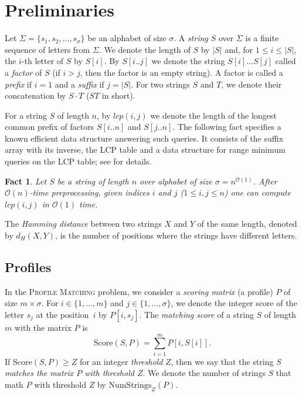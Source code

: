 \documentclass{article}
\theoremstyle{plain}
\newtheorem{fact}[theorem]{Fact}
\theoremstyle{definition}
\newcommand{\PM}{\textsc{Profile Matching}\xspace}
\newcommand{\Oh}{\mathcal{O}}
\newcommand{\lcp}{\mathit{lcp}}
\newcommand{\HammingDistance}{d_H}
\newcommand{\Score}{\mathrm{Score}}
\newcommand{\NumStrings}{\mathrm{NumStrings}}
\begin{document}
  \section{Preliminaries}\label{sec:Preliminaries}
    Let $\Sigma=\{s_1,s_2,\ldots,s_{\sigma}\}$ be an alphabet of size $\sigma$.
    A \emph{string} $S$ over $\Sigma$ is a finite sequence of letters from $\Sigma$.
    We denote the length of $S$ by $|S|$ and, for $1 \le i \le |S|$,
    the $i$-th letter of $S$ by $S[i]$.
    By $S[i..j]$ we denote the string $S[i] \ldots S[j]$ called a \emph{factor} of $S$
    (if $i>j$, then the factor is an empty string).
    A factor is called a \emph{prefix} if $i=1$ and a \emph{suffix} if $j=|S|$.
    For two strings $S$ and $T$, we denote their concatenation by $S \cdot T$ ($ST$ in short).

    For a string $S$ of length $n$, by $\lcp(i,j)$ we denote the length of the longest common prefix of factors $S[i..n]$ and $S[j..n]$.
    The following fact specifies a known efficient data structure answering such queries.
    It consists of the suffix array with its inverse, the LCP table and a data structure for range minimum queries on
    the LCP table; see \cite{AlgorithmsOnStrings} for details.

    \begin{fact}\label{fct:ver}
      Let $S$ be a string of length $n$ over alphabet of size $\sigma = n^{\Oh(1)}$.
      After $\Oh(n)$-time preprocessing, given indices $i$ and $j$ ($1 \le i,j \le n$) one can compute $\lcp(i,j)$ in $\Oh(1)$ time.
    \end{fact}

    The \emph{Hamming distance} between two strings $X$ and $Y$ of the same length,
    denoted by $\HammingDistance(X,Y)$, is the number of positions where the strings have different letters.

    \subsection{Profiles}
    In the \PM problem, we consider a \emph{scoring matrix} (a profile) $P$ of size $m \times \sigma$.
    For $i \in \{1,\ldots,m\}$ and $j \in \{1,\ldots,\sigma\}$, we denote the integer score of the letter $s_j$
    at the position~$i$ by $P[i,s_j]$.
    The \emph{matching score} of a string $S$ of length $m$ with the matrix $P$ is
    $$\Score(S,P) = \sum_{i=1}^m P[i,S[i]].$$
    If $\Score(S,P) \ge Z$ for an integer \emph{threshold} $Z$, then we say that the string $S$ \emph{matches the matrix $P$
    with threshold $Z$}.
    We denote the number of strings $S$ that math $P$ with threshold $Z$ by $\NumStrings_Z(P)$.
    
\end{document}
